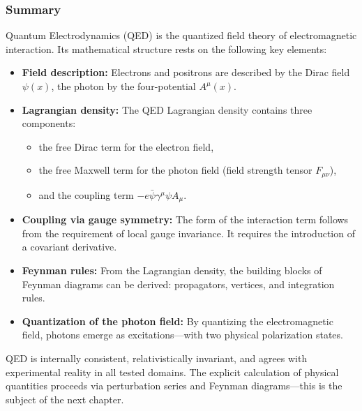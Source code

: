 \subsubsection{Summary}

Quantum Electrodynamics (QED) is the quantized field theory of electromagnetic interaction. Its mathematical structure rests on the following key elements:

\begin{itemize}
	\item \textbf{Field description:} Electrons and positrons are described by the Dirac field $\psi(x)$, the photon by the four-potential $A^\mu(x)$.
	\item \textbf{Lagrangian density:} The QED Lagrangian density contains three components:
	\begin{itemize}
		\item the free Dirac term for the electron field,
		\item the free Maxwell term for the photon field (field strength tensor $F_{\mu\nu}$),
		\item and the coupling term $-e \bar{\psi} \gamma^\mu \psi A_\mu$.
	\end{itemize}
	\item \textbf{Coupling via gauge symmetry:} The form of the interaction term follows from the requirement of local gauge invariance. It requires the introduction of a covariant derivative.
	\item \textbf{Feynman rules:} From the Lagrangian density, the building blocks of Feynman diagrams can be derived: propagators, vertices, and integration rules.
	\item \textbf{Quantization of the photon field:} By quantizing the electromagnetic field, photons emerge as excitations—with two physical polarization states.
\end{itemize}

QED is internally consistent, relativistically invariant, and agrees with experimental reality in all tested domains. The explicit calculation of physical quantities proceeds via perturbation series and Feynman diagrams—this is the subject of the next chapter.

